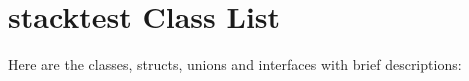 \section{stacktest Class List}
Here are the classes, structs, unions and interfaces with brief descriptions:\begin{CompactList}
\item{}
\item{}
\item{}
\item{}
\end{CompactList}
